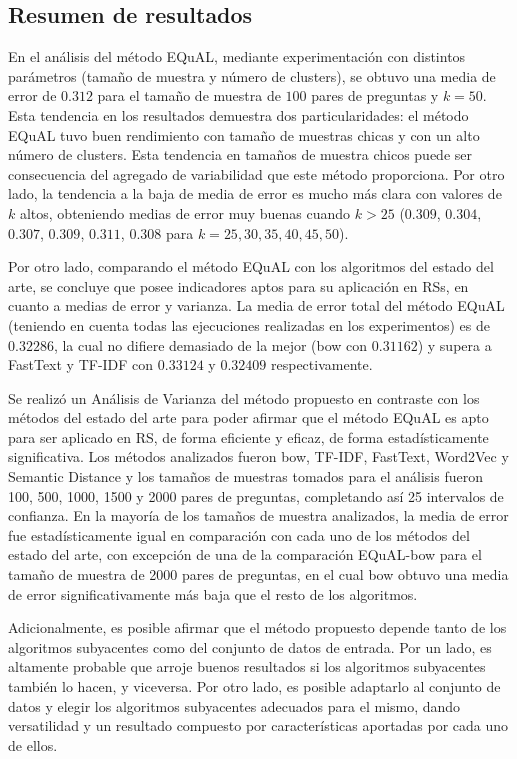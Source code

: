\subsection{Resumen de resultados}

En el análisis del método EQuAL, mediante experimentación con distintos parámetros (tamaño de muestra y número de clusters), se obtuvo una media de error de \(0.312\) para el tamaño de muestra de \(100\) pares de preguntas y \(k = 50\). Esta tendencia en los resultados demuestra dos particularidades: el método EQuAL tuvo buen rendimiento con tamaño de muestras chicas y con un alto número de clusters. Esta tendencia en tamaños de muestra chicos puede ser consecuencia del agregado de variabilidad que este método proporciona. Por otro lado, la tendencia a la baja de media de error es mucho más clara con valores de \(k\) altos, obteniendo medias de error muy buenas cuando \(k > 25\) (\(0.309\), \(0.304\), \(0.307\), \(0.309\), \(0.311\), \(0.308\) para \(k = 25, 30, 35, 40, 45, 50\)).

\bigskip Por otro lado, comparando el método EQuAL con los algoritmos del estado del arte, se concluye que posee indicadores aptos para su aplicación en RSs, en cuanto a medias de error y varianza. La media de error total del método EQuAL (teniendo en cuenta todas las ejecuciones realizadas en los experimentos) es de \(0.32286\), la cual no difiere demasiado de la mejor (bow con \(0.31162\)) y supera a FastText y TF-IDF con \(0.33124\) y \(0.32409\) respectivamente.

\bigskip Se realizó un Análisis de Varianza del método propuesto en contraste con los métodos del estado del arte para poder afirmar que el método EQuAL es apto para ser aplicado en RS, de forma eficiente y eficaz, de forma estadísticamente significativa. Los métodos analizados fueron bow, TF-IDF, FastText, Word2Vec y Semantic Distance y los tamaños de muestras tomados para el análisis fueron 100, 500, 1000, 1500 y 2000 pares de preguntas, completando así 25 intervalos de confianza. En la mayoría de los tamaños de muestra analizados, la media de error fue estadísticamente igual en comparación con cada uno de los métodos del estado del arte, con excepción de una de la comparación EQuAL-bow para el tamaño de muestra de 2000 pares de preguntas, en el cual bow obtuvo una media de error significativamente más baja que el resto de los algoritmos.

\bigskip Adicionalmente, es posible afirmar que el método propuesto depende tanto de los algoritmos subyacentes como del conjunto de datos de entrada. Por un lado, es altamente probable que arroje buenos resultados si los algoritmos subyacentes también lo hacen, y viceversa. Por otro lado, es posible adaptarlo al conjunto de datos y elegir los algoritmos subyacentes adecuados para el mismo, dando versatilidad y un resultado compuesto por características aportadas por cada uno de ellos.

